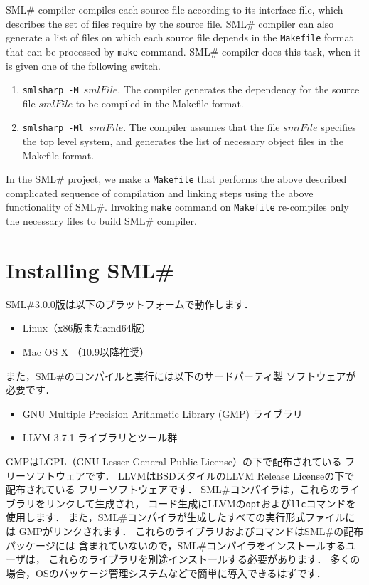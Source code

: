 \documentclass{jbook}
\newif\ifjp
\newcommand{\txt}[2]{#2}
\newcommand{\smlsharp}{SML\#}
\newcommand{\version}{3.0.0}
\begin{document}
	\smlsharp{} compiler compiles each source file according to its
interface file, which describes the set of files require by the source
file.
	\smlsharp{} compiler can also generate a list of files on which
each source file depends in the {\tt Makefile} format that can be
processed by {\tt make} command. 
	\smlsharp{} compiler does this task, when it is given one of the
following switch.

\begin{enumerate}
\item {\tt smlsharp -M $\mathit{smlFile}$}.
	The compiler generates the dependency for the source file
$\mathit{smlFile}$ to be compiled in the Makefile format. 
\item {\tt smlsharp -Ml $\mathit{smiFile}$}.
	The compiler assumes that the file $\mathit{smiFile}$ specifies the
top level system, and generates the list of necessary object files in the
Makefile format. 
\end{enumerate}	

	In the \smlsharp{} project, we make a {\tt Makefile} that
performs the above described complicated sequence of compilation and
linking steps using the above functionality of \smlsharp{}.
	Invoking {\tt make} command on {\tt Makefile} re-compiles only
the necessary files to build \smlsharp{} compiler.
\fi%

\section{
\txt{\smlsharp{}のインストール}
    {Installing \smlsharp{}}}
\label{sec:tutorialInstall}

\ifjp%
	\smlsharp{}\version{}版は以下のプラットフォームで動作します．
\begin{itemize}
\item Linux（x86版またamd64版）
\item Mac OS X （10.9以降推奨）
\end{itemize}

	また，\smlsharp{}のコンパイルと実行には以下のサードパーティ製
ソフトウェアが必要です．
\begin{itemize}
\item GNU Multiple Precision Arithmetic Library (GMP) ライブラリ　
\item LLVM 3.7.1 ライブラリとツール群
\end{itemize}
	GMPはLGPL（GNU Lesser General Public License）の下で配布されている
フリーソフトウェアです．
	LLVMはBSDスタイルのLLVM Release Licenseの下で配布されている
フリーソフトウェアです．
	\smlsharp{}コンパイラは，これらのライブラリをリンクして生成され，
コード生成にLLVMの{\tt opt}および{\tt llc}コマンドを使用します．
	また，\smlsharp{}コンパイラが生成したすべての実行形式ファイルには
GMPがリンクされます．
	これらのライブラリおよびコマンドは\smlsharp{}の配布パッケージには
含まれていないので，\smlsharp{}コンパイラをインストールするユーザは，
これらのライブラリを別途インストールする必要があります．
	多くの場合，OSのパッケージ管理システムなどで簡単に導入できるはずです．
\end{document}
